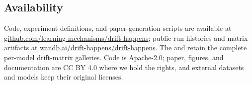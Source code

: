 \tightvspace{-5pt}
\subsection{Availability}

\tightvspace{-5pt}
Code, experiment definitions, and paper-generation scripts are available at \href{https://github.com/learning-mechanisms/drift-happens/}{github.com/learning-mechanisms/drift-happens}; public run histories and matrix artifacts at \href{https://wandb.ai/drift-happens/drift-happens}{wandb.ai/drift-happens/drift-happens}. The \extendedpreprintlink{} and \resultssitelink{} retain the complete per-model drift-matrix galleries. Code is Apache-2.0; paper, figures, and documentation are CC BY 4.0 where we hold the rights, and external datasets and models keep their original licenses.

